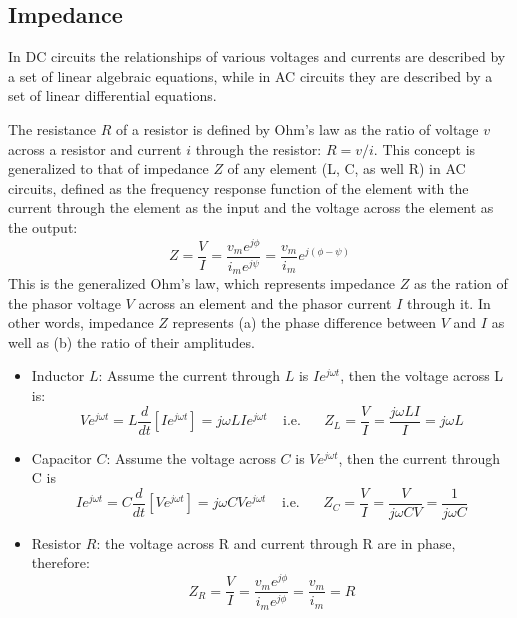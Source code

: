 \documentclass{article}
\begin{document}
\subsection*{Impedance}

In DC circuits the relationships of various voltages and currents are described 
by a set of linear algebraic equations, while in AC circuits they are described
by a set of linear differential equations. 

The resistance $R$ of a resistor is defined by Ohm's law as the ratio of voltage 
$v$ across a resistor and current $i$ through the resistor: $ R=v/i$.
This concept is generalized to that of impedance $Z$ of any element (L, C, as
well R) in AC circuits, defined as the frequency response function of the element
with the current through the element as the input and the voltage across the element
as the output:
\begin{equation}
  Z=\frac{V}{I}=\frac{v_m e^{j\phi}}{i_m e^{j\psi}}=\frac{v_m}{i_m} e^{j(\phi-\psi)} 
\end{equation}
This is the generalized Ohm's law, which represents impedance $Z$ as the ration 
of the phasor voltage $V$ across an element and the phasor current $I$ through it.
In other words, impedance $Z$ represents (a) the phase difference between $V$ and 
$I$ as well as (b) the ratio of their amplitudes.


\begin{itemize}
\item Inductor $L$: Assume the current through $L$ is $I e^{j\omega t}$, 
  then the voltage across L is:
  \begin{equation} 
    V e^{j\omega t}=L\frac{d}{dt} [I e^{j\omega t}]=j\omega L I e^{j\omega t}
    \;\;\;\;\mbox{i.e.}\;\;\;\;\;\;Z_L=\frac{V}{I}=\frac{j\omega LI}{I}=j\omega L 
  \end{equation}
\item Capacitor $C$: Assume the voltage across $C$ is $V e^{j\omega t}$, 
  then the current through C is
  \begin{equation} 
    I e^{j\omega t}=C\frac{d}{dt} [V e^{j\omega t}]=j\omega C V e^{j\omega t}
    \;\;\;\;\mbox{i.e.}\;\;\;\;\;\;Z_C=\frac{V}{I}=\frac{V}{j\omega CV}=\frac{1}{j\omega C} 
  \end{equation}
\item Resistor $R$: the voltage across R and current through R are in phase, therefore:
  \begin{equation}
    Z_R=\frac{V}{I}=\frac{v_me^{j\phi}}{i_me^{j\phi}}=\frac{v_m}{i_m}=R 
  \end{equation}
\end{itemize}
\end{document}
